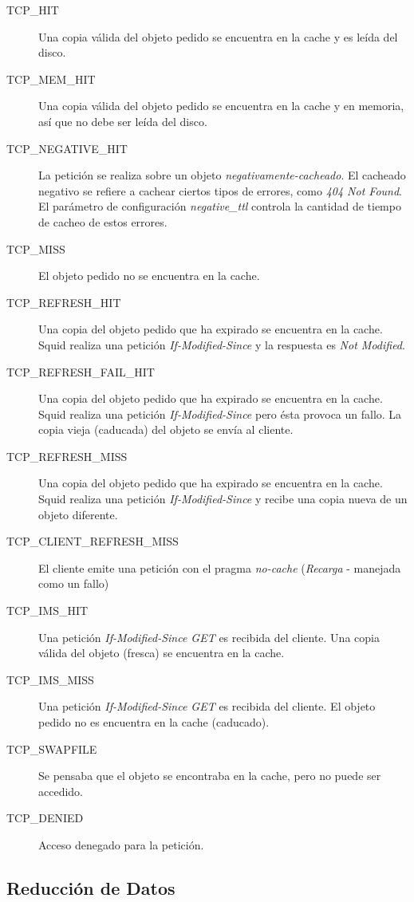 \documentclass[twocolumn]{Jornadas}
\begin{document}
\begin{description}
\item[TCP\_HIT] Una copia válida del objeto pedido se encuentra en la cache y es leída del disco.
\item[TCP\_MEM\_HIT] Una copia válida del objeto pedido se encuentra en la cache y en memoria, así que no debe ser leída del disco.
\item[TCP\_NEGATIVE\_HIT] La petición se realiza sobre un objeto \emph{negativamente-cacheado}. El cacheado negativo se refiere a cachear ciertos tipos de errores, como \emph{404 Not Found}. El parámetro de configuración \emph{negative\_ttl} controla la cantidad de tiempo de cacheo de estos errores.
\item[TCP\_MISS] El objeto pedido no se encuentra en la cache.
\item[TCP\_REFRESH\_HIT] Una copia del objeto pedido que ha expirado se encuentra en la cache. Squid realiza una petición \emph{If-Modified-Since} y la respuesta es \emph{Not Modified}.
\item[TCP\_REFRESH\_FAIL\_HIT] Una copia del objeto pedido que ha expirado se encuentra en la cache. Squid realiza una petición \emph{If-Modified-Since} pero ésta provoca un fallo. La copia vieja (caducada) del objeto se envía al cliente.
\item[TCP\_REFRESH\_MISS] Una copia del objeto pedido que ha expirado se encuentra en la cache. Squid realiza una petición \emph{If-Modified-Since} y recibe una copia nueva de un objeto diferente.
\item[TCP\_CLIENT\_REFRESH\_MISS] El cliente emite una petición con el pragma \emph{no-cache} (\emph{Recarga} - manejada como un fallo)
\item[TCP\_IMS\_HIT] Una petición \emph{If-Modified-Since GET} es recibida del cliente. Una copia válida del objeto (fresca) se encuentra en la cache.
\item[TCP\_IMS\_MISS] Una petición \emph{If-Modified-Since GET} es recibida del cliente. El objeto pedido no es encuentra en la cache (caducado).
\item[TCP\_SWAPFILE] Se pensaba que el objeto se encontraba en la cache, pero no puede ser accedido.
\item[TCP\_DENIED] Acceso denegado para la petición.
\end{description}

\subsection{Reducción de Datos}
\label{red_datos}
\end{document}

